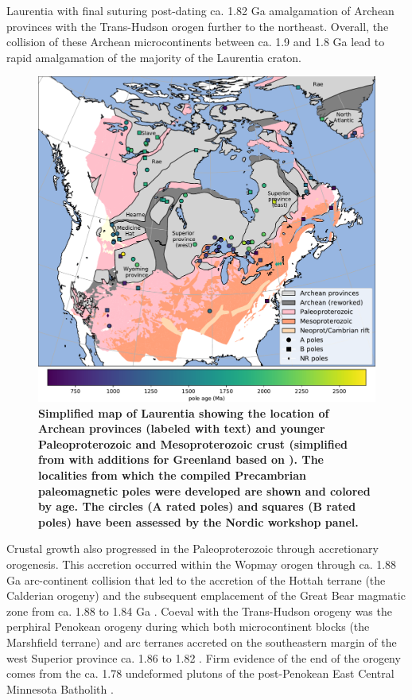 \documentclass[11pt,letterpaper]{article}
\begin{document}
Laurentia with final suturing post-dating ca. 1.82 Ga amalgamation of Archean provinces with the Trans-Hudson orogen further to the northeast. Overall, the collision of these Archean microcontinents between ca. 1.9 and 1.8 Ga lead to rapid amalgamation of the majority of the Laurentia craton.

\begin{figure}
\centering
\includegraphics[width=\textwidth]{../Figures/Fig1_map.pdf}
\caption{\small{\textbf{Simplified map of Laurentia showing the location of Archean provinces (labeled with text) and younger Paleoproterozoic and Mesoproterozoic crust (simplified from \citealp{Whitmeyer2007a} with additions for Greenland based on \citealp{St-Onge2009a}). The localities from which the compiled Precambrian paleomagnetic poles were developed are shown and colored by age. The circles (A rated poles) and squares (B rated poles) have been assessed by the Nordic workshop panel.}}}
\label{fig:Laurentia_map}
\end{figure} 

Crustal growth also progressed in the Paleoproterozoic through accretionary orogenesis. This accretion occurred within the Wopmay orogen through ca. 1.88 Ga arc-continent collision that led to the accretion of the Hottah terrane (the Calderian orogeny) and the subsequent emplacement of the Great Bear magmatic zone from ca. 1.88 to 1.84 Ga \citep{Hildebrand2009a}. Coeval with the Trans-Hudson orogeny was the perphiral Penokean orogeny during which both microcontinent blocks (the Marshfield terrane) and arc terranes accreted on the southeastern margin of the west Superior province ca. 1.86 to 1.82 \citep{Schulz2007a}. Firm evidence of the end of the orogeny comes from the ca. 1.78 undeformed plutons of the post-Penokean East Central Minnesota Batholith \citep{Holm2005a}. 
\end{document}
